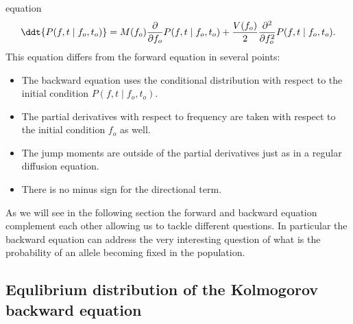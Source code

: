 equation
\begin{equation}
	\ddt{P(f, t \mid f_o, t_o)} =
	M(f_o) {\partial \over \partial f_o}P(f, t \mid f_o, t_o) +
	{V(f_o) \over 2} {\partial^2 \over \partial f_o^2} P(f, t \mid f_o, t_o).
	\label{eq_kolmogorov_backward}
\end{equation}
This equation differs from the forward equation in several points:
\begin{itemize}
	\item The backward equation uses the conditional distribution with respect
	to the initial condition $P(f, t \mid f_o, t_o)$.
	\item The partial derivatives with respect to frequency are taken with
	respect to the initial condition $f_o$ as well.
	\item The jump moments are outside of the partial derivatives just as in a
	regular diffusion equation.
	\item There is no minus sign for the directional term.
\end{itemize}
As we will see in the following section the forward and backward equation
complement each other allowing us to tackle different questions. In particular
the backward equation can address the very interesting question of what is the
probability of an allele becoming fixed in the population.

\subsection{Equlibrium distribution of the Kolmogorov backward equation}

